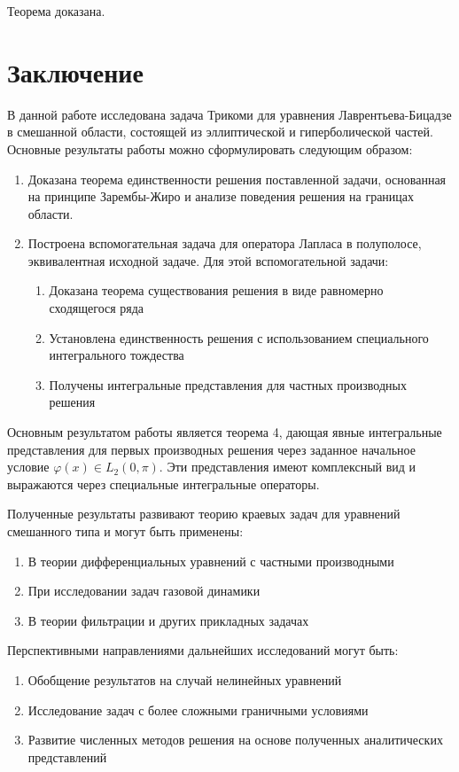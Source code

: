 \documentclass[12pt, a4paper]{article}
\begin{document}
	Теорема доказана.

\section{Заключение}
В данной работе исследована задача Трикоми для уравнения Лаврентьева-Бицадзе в смешанной области, состоящей из эллиптической и гиперболической частей. Основные результаты работы можно сформулировать следующим образом:
\begin{enumerate}
	\item Доказана теорема единственности решения поставленной задачи, основанная на принципе Зарембы-Жиро и анализе поведения решения на границах области.
	\item Построена вспомогательная задача для оператора Лапласа в полуполосе, эквивалентная исходной задаче. Для этой вспомогательной задачи:
	\begin{enumerate}
		\item Доказана теорема существования решения в виде равномерно сходящегося ряда
		\item Установлена единственность решения с использованием специального интегрального тождества
		\item Получены интегральные представления для частных производных решения
	\end{enumerate}
\end{enumerate}

Основным результатом работы является теорема 4, дающая явные интегральные представления для первых производных решения через заданное начальное условие $\varphi(x) \in L_2(0,\pi)$. Эти представления имеют комплексный вид и выражаются через специальные интегральные операторы.

Полученные результаты развивают теорию краевых задач для уравнений смешанного типа и могут быть применены:
\begin{enumerate}
	\item В теории дифференциальных уравнений с частными производными
	\item При исследовании задач газовой динамики
	\item В теории фильтрации и других прикладных задачах
\end{enumerate}
Перспективными направлениями дальнейших исследований могут быть:
\begin{enumerate}
	\item Обобщение результатов на случай нелинейных уравнений
	\item Исследование задач с более сложными граничными условиями
	\item Развитие численных методов решения на основе полученных аналитических представлений
\end{enumerate}
\end{document}
